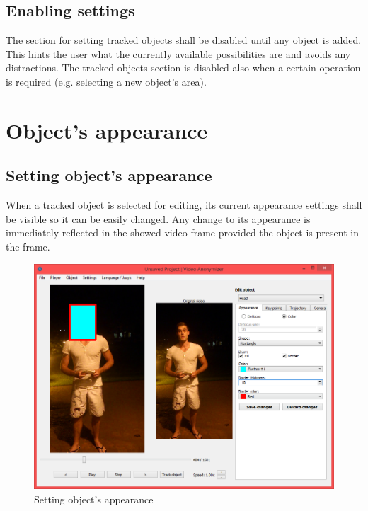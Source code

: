 \subsection{Enabling settings}
The section for setting tracked objects shall be disabled until any object is added. This hints the user what the currently available possibilities are and avoids any distractions. The tracked objects section is disabled also when a certain operation is required (e.g. selecting a new object's area).

\section{Object's appearance}
\subsection{Setting object's appearance}
When a tracked object is selected for editing, its current appearance settings shall be visible so it can be easily changed. Any change to its appearance is immediately reflected in the showed video frame provided the object is present in the frame.
\begin{figure}[!htbp]
\centering
\includegraphics[width=\textwidth]{png/appearance_save}
\caption{Setting object's appearance}
\label{fig:appearance_save}
\end{figure}


